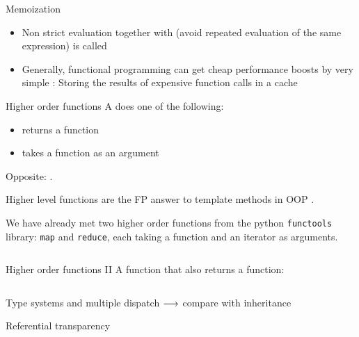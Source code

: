 \begin{frame}[t]{Memoization}
	\begin{itemize}
		\item<+-> Non strict evaluation together with  (avoid repeated evaluation of the same expression) is called 
		\item<+-> Generally, functional programming can get cheap performance boosts by very simple : Storing the results of expensive  function calls in a cache
		
	\end{itemize}
\end{frame}

\begin{frame}{Higher order functions}
	A  does one of the following:
	\begin{itemize}
		\item returns a function
		\item takes a function as an argument
	\end{itemize}
	Opposite: .
	
	\medskip 
	
	\medskip
	Higher level functions are the FP answer to template methods in OOP .
	
	\medskip
	{We have already met two higher order functions from the python \texttt{functools} library: \texttt{map} and \texttt{reduce}, each taking a function and an iterator as arguments.}
	\inputminted[lastline=8]{python}{code/paradigms/fp/higher_order.py}
\end{frame}

\begin{frame}{Higher order functions II}
	A function that also returns a function:
	
	\inputminted[lastline=8]{python}{code/paradigms/fp/higher_order_2.py}
\end{frame}

\begin{frame}{Type systems and multiple dispatch}
	$\longrightarrow$ compare with inheritance
\end{frame}

\begin{frame}{Referential transparency}
\end{frame}

